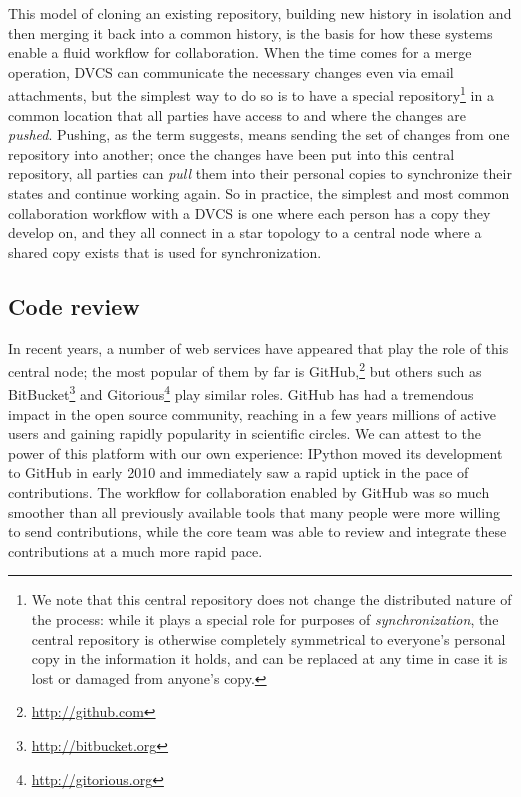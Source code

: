 \documentclass[11pt,oneside,english]{article}
\begin{document}
This model of cloning an existing repository, building new history in isolation
and then merging it back into a common history, is the basis for how these
systems enable a fluid workflow for collaboration.  When the time comes for
a merge operation, DVCS can communicate the necessary changes even
via email attachments, but the simplest way to do so is to have a special
repository\footnote{We note that this central repository does not change the
  distributed nature of the process: while it plays a special role for purposes
  of \emph{synchronization}, the central repository is otherwise completely
  symmetrical to everyone's personal copy in the information it holds, and can
  be replaced at any time in case it is lost or damaged from anyone's copy.} in
a common location that all parties have access to and where the changes are
\emph{pushed}.  Pushing, as the term suggests, means sending the set of
changes from one repository into another; once the changes have been put into
this central repository, all parties can \emph{pull} them into their personal
copies to synchronize their states and continue working again.  So in practice,
the simplest and most common collaboration workflow with a DVCS is one where
each person has a copy they develop on, and they all connect in a star topology
to a central node where a shared copy exists that is used for synchronization.

\subsection{Code review}\label{subsec:code_review}

In recent years, a number of web services have appeared that play the role of
this central node; the most popular of them by far is
GitHub,\footnote{\url{http://github.com}} but others such as
BitBucket\footnote{\url{http://bitbucket.org}} and
Gitorious\footnote{\url{http://gitorious.org}} play similar roles.  GitHub has
had a tremendous impact in the open source community, reaching in a few years
millions of active users and gaining rapidly popularity in scientific circles.
We can attest to the power of this platform with our own experience:
IPython moved its development to GitHub in early 2010 and
immediately saw a rapid uptick in the pace of contributions.  The workflow for
collaboration enabled by GitHub was so much smoother than all previously
available tools that many people were more willing to send contributions, while
the core team was able to review and integrate these contributions at a much
more rapid pace.
\end{document}
